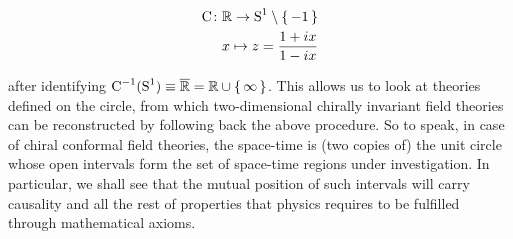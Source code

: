 \begin{center}
 \begin{minipage}{.48\textwidth}
 \begin{align*}
 \textrm{C}\colon &\mathbb{R}\to\textrm{S}^1\setminus\set{-1}\\
 & x\mapsto z=\frac{1+ix}{1-ix}
 \end{align*}
 \end{minipage}
 \begin{minipage}{.48\textwidth}
 \centering
 \def\radius{0.8}
 \end{minipage}
\end{center}
after identifying $\textrm{C}^{-1}(\textrm{S}^1)\equiv\overline{\mathbb{R}}=\mathbb{R}
\cup\set{\infty}$. This allows us to look at theories defined 
on the circle, from which two-dimensional chirally invariant
field theories can be reconstructed by following back the above
procedure. So to speak, in case of chiral conformal field theories,
the space-time is (two copies of) the unit circle whose open intervals
form the set of space-time regions under investigation. In particular,
we shall see that the mutual position of such intervals will carry
causality and all the rest of properties that physics requires to
be fulfilled through mathematical axioms.


